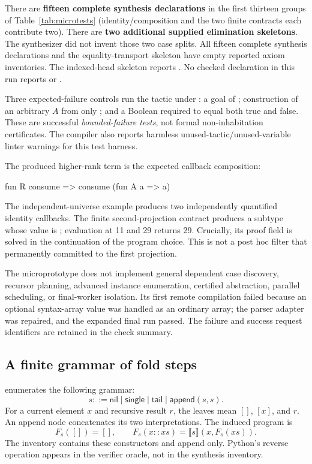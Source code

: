 There are \textbf{fifteen complete synthesis declarations} in the first thirteen
groups of Table~\ref{tab:microtests} (identity/composition and the two finite
contracts each contribute two). There are \textbf{two additional supplied
elimination skeletons}. The synthesizer did not invent those two case splits.
All fifteen complete synthesis declarations and the equality-transport skeleton
have empty reported axiom inventories. The indexed-head skeleton reports
. No checked declaration in this run reports  or
.

Three expected-failure controls run the tactic under :
a goal of ; construction of an arbitrary $A$ from only
; and a Boolean required to equal both true and false. These
are successful \emph{bounded-failure tests}, not formal non-inhabitation
certificates. The compiler also reports harmless unused-tactic/unused-variable
linter warnings for this test harness.

The produced higher-rank term is the expected callback composition:
\begin{Code}
fun R consume => consume (fun A a => a)
\end{Code}
The independent-universe example produces two independently quantified identity
callbacks. The finite second-projection contract produces a subtype whose
value is ; evaluation at 11 and 29 returns 29. Crucially,
its proof field is solved in the continuation of the program choice. This is
not a post hoc filter that permanently committed to the first projection.

The microprototype does not implement general dependent case discovery,
recursor planning, advanced instance enumeration, certified abstraction,
parallel scheduling, or final-worker isolation. Its first remote compilation
failed because an optional syntax-array value was handled as an ordinary
array; the parser adapter was repaired, and the expanded final run passed.
The failure and success request identifiers are retained in the check summary.

\subsection{A finite grammar of fold steps}

 enumerates the following grammar:
\[
 s::=\mathsf{nil}\mid\mathsf{single}\mid\mathsf{tail}
       \mid\mathsf{append}(s,s).
\]
For a current element $x$ and recursive result $r$, the leaves mean $[]$, $[x]$,
and $r$. An append node concatenates its two interpretations. The induced
program is
\[
 F_s([])=[],\qquad F_s(x::xs)=\llbracket s\rrbracket(x,F_s(xs)).
\]
The inventory contains these constructors and append only. Python's reverse
operation appears in the verifier oracle, not in the synthesis inventory.

